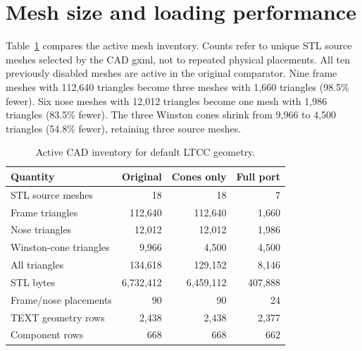 \FloatBarrier

\section{Mesh size and loading performance}

Table~\ref{tab:1} compares the active mesh inventory. Counts refer to unique STL source meshes selected by the
CAD gxml, not to repeated physical placements. All ten previously disabled meshes are active in the original
comparator. Nine frame meshes with 112,640 triangles become three meshes with 1,660 triangles (98.5\% fewer).
Six nose meshes with 12,012 triangles become one mesh with 1,986 triangles (83.5\% fewer). The three Winston
cones shrink from 9,966 to 4,500 triangles (54.8\% fewer), retaining three source meshes.

\begin{table}[htbp]

\caption{Active CAD inventory for default LTCC geometry.}

\label{tab:1}

\centering

\small

\setlength{\tabcolsep}{4pt}

\renewcommand{\arraystretch}{1.15}

\begin{tabularx}{\textwidth}{@{}Xrrr@{}}

\toprule

Quantity & Original & Cones only & Full port \\

\midrule

STL source meshes & 18 & 18 & 7 \\

Frame triangles & 112,640 & 112,640 & 1,660 \\

Nose triangles & 12,012 & 12,012 & 1,986 \\

Winston-cone triangles & 9,966 & 4,500 & 4,500 \\

All triangles & 134,618 & 129,152 & 8,146 \\

STL bytes & 6,732,412 & 6,459,112 & 407,888 \\

Frame/nose placements & 90 & 90 & 24 \\

TEXT geometry rows & 2,438 & 2,438 & 2,377 \\

Component rows & 668 & 668 & 662 \\

\bottomrule

\end{tabularx}

\end{table}

